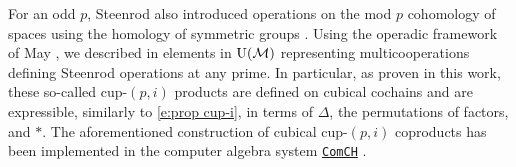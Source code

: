 For an odd $p$, Steenrod also introduced operations on the mod $p$ cohomology of spaces using the homology of symmetric groups \cite{steenrod1952reduced, steenrod1953cyclic}.
Using the operadic framework of May \cite{may1970general}, we described in \cite{medina2021may_st} elements in ${\operatorname{U}(\mathcal{M})}$ representing multicooperations defining Steenrod operations at any prime.
In particular, as proven in this work, these so-called cup-$(p,i)$ products are defined on cubical cochains and are expressible, similarly to \cref{e:prop cup-i}, in terms of $\Delta$, the permutations of factors, and $\ast$.
The aforementioned construction of cubical cup-$(p,i)$ coproducts has been implemented in the computer algebra system \href{https://comch.readthedocs.io/en/latest/}{\texttt{ComCH}} \cite{medina2021comch}.